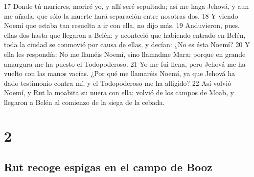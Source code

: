 17 Donde tú murieres, moriré yo, y allí seré sepultada; así me haga Jehová, y aun me añada, que sólo la muerte hará separación entre nosotras dos. 
18 Y viendo Noemí que estaba tan resuelta a ir con ella, no dijo más.
19 Anduvieron, pues, ellas dos hasta que llegaron a Belén; y aconteció que habiendo entrado en Belén, toda la ciudad se conmovió por causa de ellas, y decían: ¿No es ésta Noemí?
20 Y ella les respondía: No me llaméis Noemí, sino llamadme Mara; porque en grande amargura me ha puesto el Todopoderoso.
21 Yo me fui llena, pero Jehová me ha vuelto con las manos vacías. ¿Por qué me llamaréis Noemí, ya que Jehová ha dado testimonio contra mí, y el Todopoderoso me ha afligido?
22 Así volvió Noemí, y Rut la moabita su nuera con ella; volvió de los campos de Moab, y llegaron a Belén al comienzo de la siega de la cebada.

\chapter{2}

\section*{Rut recoge espigas en el campo de Booz}

